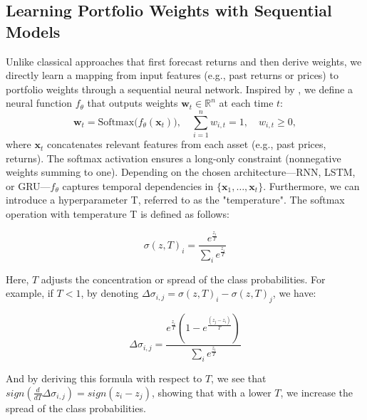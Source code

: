 \documentclass[11pt]{article}
\begin{document}
\subsection{Learning Portfolio Weights with Sequential Models}
Unlike classical approaches that first forecast returns and then derive weights, we directly learn a mapping from input features (e.g., past returns or prices) to portfolio weights through a sequential neural network. Inspired by \cite{zhang2020deep}, we define a neural function \(f_\theta\) that outputs weights 
\(\mathbf{w}_t \in \mathbb{R}^n\) at each time \(t\):
\begin{equation}\label{eq:weights_model}
    \mathbf{w}_t = \mathrm{Softmax}\bigl(f_\theta(\mathbf{x}_t)\bigr), 
    \quad \sum_{i=1}^{n} w_{i,t} = 1, \quad w_{i,t} \ge 0,
\end{equation}
where \(\mathbf{x}_t\) concatenates relevant features from each asset (e.g., past prices, returns). The softmax activation ensures a long-only constraint (nonnegative weights summing to one). Depending on the chosen architecture—RNN, LSTM, or GRU—\(f_\theta\) captures temporal dependencies in \(\{\mathbf{x}_1,\ldots,\mathbf{x}_t\}\). Furthermore, we can introduce a hyperparameter T, referred to as the "temperature". The softmax operation with temperature T is defined as follows:

\begin{equation}\label{eq:temperature}
    \sigma(z, T)_i = \frac{e^{\frac{z_i}{T}}}{\sum_i e^{\frac{z_i}{T}}}
\end{equation}

Here, $T$ adjusts the concentration or spread of the class probabilities. For example, if $T<1$, by denoting $\Delta \sigma_{i,j} = \sigma(z, T)_i - \sigma(z, T)_j$, we have:

\[\Delta \sigma_{i,j} = \frac{e^{\frac{z_i}{T}}\left( 1- e^{\frac{(z_j-z_i)}{T}}\right)}{\sum_i e^{\frac{z_i}{T}}}\]

And by deriving this formula with respect to $T$, we see that $sign(\frac{d}{dT} \Delta \sigma_{i,j}) = sign(z_i-z_j)$, showing that with a lower $T$, we increase the spread of the class probabilities.
\end{document}
